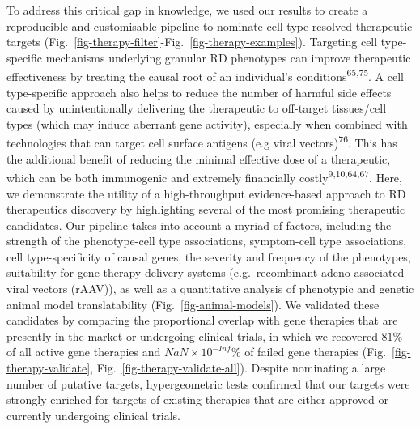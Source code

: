 \documentclass[
]{article}
\begin{document}
To address this critical gap in knowledge, we used our results to create
a reproducible and customisable pipeline to nominate cell type-resolved
therapeutic targets
(Fig.~\ref{fig-therapy-filter}-Fig.~\ref{fig-therapy-examples}).
Targeting cell type-specific mechanisms underlying granular RD
phenotypes can improve therapeutic effectiveness by treating the causal
root of an individual's conditions\textsuperscript{65,75}. A cell
type-specific approach also helps to reduce the number of harmful side
effects caused by unintentionally delivering the therapeutic to
off-target tissues/cell types (which may induce aberrant gene activity),
especially when combined with technologies that can target cell surface
antigens (e.g viral vectors)\textsuperscript{76}. This has the
additional benefit of reducing the minimal effective dose of a
therapeutic, which can be both immunogenic and extremely financially
costly\textsuperscript{9,10,64,67}. Here, we demonstrate the utility of
a high-throughput evidence-based approach to RD therapeutics discovery
by highlighting several of the most promising therapeutic candidates.
Our pipeline takes into account a myriad of factors, including the
strength of the phenotype-cell type associations, symptom-cell type
associations, cell type-specificity of causal genes, the severity and
frequency of the phenotypes, suitability for gene therapy delivery
systems (e.g.~recombinant adeno-associated viral vectors (rAAV)), as
well as a quantitative analysis of phenotypic and genetic animal model
translatability (Fig.~\ref{fig-animal-models}). We validated these
candidates by comparing the proportional overlap with gene therapies
that are presently in the market or undergoing clinical trials, in which
we recovered \(81\)\% of all active gene therapies and
\(NaN \times 10^{-Inf}\)\% of failed gene therapies
(Fig.~\ref{fig-therapy-validate}, Fig.~\ref{fig-therapy-validate-all}).
Despite nominating a large number of putative targets, hypergeometric
tests confirmed that our targets were strongly enriched for targets of
existing therapies that are either approved or currently undergoing
clinical trials.
\end{document}
